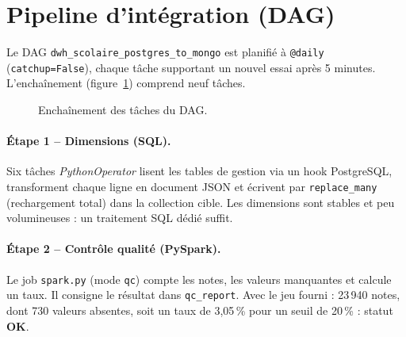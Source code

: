 ﻿\documentclass[10pt,a4paper]{article}
\begin{document}
\section{Pipeline d'intégration (DAG)}\label{sec:pipeline}
Le DAG \texttt{dwh\_scolaire\_postgres\_to\_mongo} est planifié à \texttt{@daily}
(\texttt{catchup=False}), chaque tâche supportant un nouvel essai après 5 minutes. L'enchaînement
(figure~\ref{fig:dag}) comprend neuf tâches.

\begin{figure}[h]
  \centering
  \small
  \caption{Enchaînement des tâches du DAG.}
  \label{fig:dag}
\end{figure}

\paragraph{Étape 1 -- Dimensions (SQL).} Six tâches \emph{PythonOperator} lisent les tables de
gestion via un hook PostgreSQL, transforment chaque ligne en document JSON et écrivent par
\texttt{replace\_many} (rechargement total) dans la collection cible. Les dimensions sont stables et
peu volumineuses : un traitement SQL dédié suffit.

\paragraph{Étape 2 -- Contrôle qualité (PySpark).} Le job \texttt{spark.py} (mode \texttt{qc})
compte les notes, les valeurs manquantes et calcule un taux. Il consigne le résultat dans
\texttt{qc\_report}. Avec le jeu fourni : 23\,940 notes, dont 730 valeurs absentes, soit un taux de
3{,}05\,\% pour un seuil de 20\,\% : statut \textbf{OK}.
\end{document}
